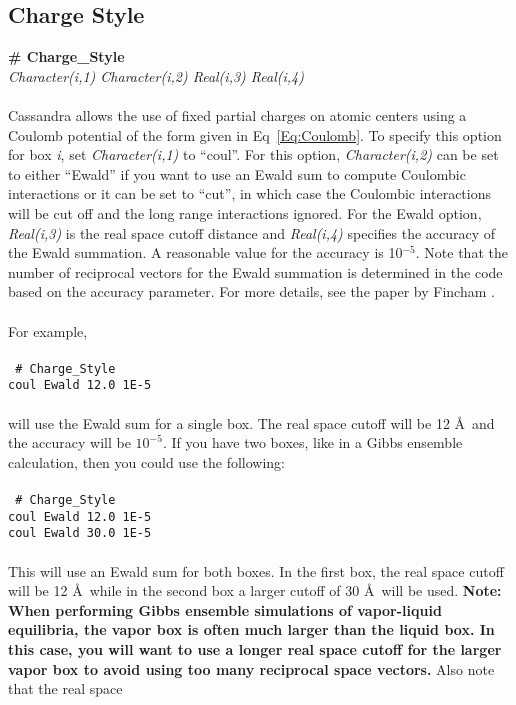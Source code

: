 \subsection{Charge Style}\label{sec:Charge_Style}
{\bf \# Charge\_Style} \\
{\it Character(i,1) Character(i,2) Real(i,3) Real(i,4)} \\ \\
%
Cassandra allows the use of fixed partial charges on atomic centers
using a Coulomb potential of the form given in Eq~\ref{Eq:Coulomb}. To
specify this option for box {\em i}, set {\it Character(i,1)} to
``coul''. For this option,
{\it Character(i,2)} can be set to either ``Ewald'' if you want to use
an Ewald sum to compute Coulombic interactions or it can be set to
``cut'', in which case the Coulombic interactions will be cut off and
the long range interactions ignored. For the Ewald option, 
{\it Real(i,3)} is the real space cutoff distance and {\it Real(i,4)}
specifies the accuracy of the Ewald summation. A reasonable value for
the accuracy is 10$^{-5}$. Note that the number of reciprocal vectors
for the Ewald summation is determined in the code based on the
accuracy parameter. For more details, see the paper by Fincham
\cite{Fincham:1994}.\\ \\ 
%
For example,
\\ \\
\texttt{
\# Charge\_Style \\
coul Ewald 12.0 1E-5}\\ \\
will use the Ewald sum for a single box. The real space cutoff will be
12 \AA\ and the accuracy will be $10^{-5}$. If you have two boxes,
like in a Gibbs ensemble calculation, then you could use the
following:
\\ \\
\texttt{
\# Charge\_Style \\
coul Ewald 12.0 1E-5\\
coul Ewald 30.0 1E-5}
\\ \\ 
This will use an Ewald sum for both boxes. In the first box, the real
space cutoff will be 12 \AA\ while in the second box a larger cutoff
of 30 \AA\ will be used. {\bf Note: When performing Gibbs ensemble
  simulations of vapor-liquid equilibria, the vapor box is often much
  larger than the liquid box. In this case, you will want to use a
  longer real space cutoff for the larger vapor box to avoid using too
  many reciprocal space vectors.} Also note that the real space
